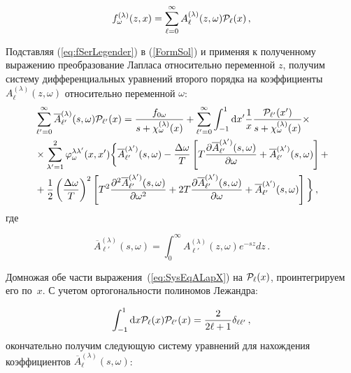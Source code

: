 \documentclass[14pt, russian]{article}
\newcommand{\dd}{\mathrm{d}} %
\begin{document}
\begin{equation}\label{eq:fSerLegender}
f_\omega^{(\lambda)}(z, x) = \sum_{\ell = 0}^{\infty} A_\ell^{(\lambda)}(z,\omega) {\cal P}_\ell(x)\, ,
\end{equation}

Подставляя (\ref{eq:fSerLegender}) в (\ref{FormSol}) и применяя к полученному выражению преобразование Лапласа относительно переменной $z$, получим систему дифференциальных уравнений второго порядка на коэффициенты $A_\ell^{(\lambda)}(z,\omega)$ относительно переменной $\omega$:
\begin{equation}\label{eq:SysEqALapX}
\begin{aligned}
&\sum_{\ell' = 0}^{\infty} \overline{A}_{\ell'}^{(\lambda)}(s,\omega) {\cal P}_{\ell'}(x) = \frac{f_{0\omega} }{s+{\cal \chi}^{(\lambda)}_\omega(x)}+
\sum_{\ell'=0}^{\infty}\int_{-1}^{1}\dd x'\frac{1}{x} \frac{{\cal P}_{\ell'}(x')}{s+{\cal \chi}_\omega^{(\lambda)}(x)} \times
\\
&\times\sum_{\lambda'=1}^2\varphi_\omega^{\lambda\lambda'}(x,x')\bigg\{ \overline{A}_{\ell'}^{(\lambda')}(s,\omega) - \frac{\Delta \omega}{T}
\left[
T \frac{\partial \overline{A}_{\ell'}^{(\lambda')}(s,\omega)}{\partial \omega} + \overline{A}_{\ell'}^{(\lambda')}(s,\omega)
\right]+
\\
&+ \frac{1}{2}\left(\frac{\Delta \omega}{T}\right)^2
\left[
T^2 \frac{\partial^2 \overline{A}_{\ell'}^{(\lambda')}(s,\omega)}{\partial \omega^2} + 2T \frac{\partial \overline{A}_{\ell'}^{(\lambda')}(s,\omega)}{\partial \omega}+\overline{A}_{\ell'}^{(\lambda')}(s,\omega)
\right]\bigg\}\, ,
\end{aligned}
\end{equation}
где 

\begin{equation}\label{lapA}
\overline{A}_{\ell'}^{(\lambda)}(s,\omega)=\int_{0}^{\infty} A^{(\lambda)}_{\ell'}(z,\omega) e^{-sz}dz\, .
\end{equation}

Домножая обе части выражения~(\ref{eq:SysEqALapX}) на ${\cal P}_\ell(x)$, проинтегрируем его по~$x$. С учетом
ортогональности полиномов Лежандра:

\begin{equation}
\int_{-1}^{1}\dd x {\cal P}_\ell(x) {\cal P}_{\ell'}(x)=\frac{2}{2\ell+1}\delta_{\ell \ell'}\, ,
\end{equation}
окончательно получим следующую систему уравнений для нахождения коэффициентов $\overline{A}_\ell^{(\lambda)}(s,\omega)$:
\end{document}
